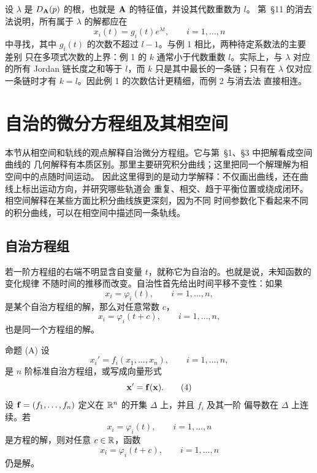 设 \(\lambda\) 是 \(D_{\mathbf{A}}(p)\) 的根，也就是 \(\mathbf{A}\) 的特征值，并设其代数重数为 \(l\)。
第~\S11 的消去法说明，所有属于 \(\lambda\) 的解都应在
\[
 x_i(t)=g_i(t)e^{\lambda t},\qquad i=1,\ldots,n
\]
中寻找，其中 \(g_i(t)\) 的次数不超过 \(l-1\)。与例 1 相比，两种待定系数法的主要差别
只在多项式次数的上界：例 1 的 \(k\) 通常小于代数重数 \(l\)。实际上，与 \(\lambda\)
对应的所有 Jordan 链长度之和等于 \(l\)，而 \(k\) 只是其中最长的一条链；只有在
\(\lambda\) 仅对应一条链时才有 \(k=l\)。因此例 1 的次数估计更精细，而例 2 与消去法
直接相连。

\section{自治的微分方程组及其相空间}

本节从相空间和轨线的观点解释自治微分方程组。它与第~\S1、\S3 中把解看成空间曲线的
几何解释有本质区别。那里主要研究积分曲线；这里把同一个解理解为相空间中的点随时间运动。
因此这里得到的是动力学解释：不仅画出曲线，还在曲线上标出运动方向，并研究哪些轨道会
重复、相交、趋于平衡位置或绕成闭环。相空间解释在某些方面比积分曲线族更深刻，因为不同
时间参数化下看起来不同的积分曲线，可以在相空间中描述同一条轨线。

\subsection*{自治方程组}

若一阶方程组的右端不明显含自变量 \(t\)，就称它为自治的。也就是说，未知函数的变化规律
不随时间的推移而改变。自治性首先给出时间平移不变性：如果
\begin{equation}
 x_i=\varphi_i(t),\qquad i=1,\ldots,n,
 \tag{1}
\end{equation}
是某个自治方程组的解，那么对任意常数 \(c\)，
\begin{equation}
 x_i=\varphi_i(t+c),\qquad i=1,\ldots,n,
 \tag{2}
\end{equation}
也是同一个方程组的解。

\begin{sourceitem}{命题 (A)}
设
\begin{equation}
 x_i'=f_i(x_1,\ldots,x_n),\qquad i=1,\ldots,n,
 \tag{3}
\end{equation}
是 \(n\) 阶标准自治方程组，或写成向量形式
\begin{equation}
 \vect{x}'=\vect{f}(\vect{x}).
 \tag{4}
\end{equation}
设 \(\vect{f}=(f_1,\ldots,f_n)\) 定义在 \(\mathbb R^n\) 的开集 \(\Delta\) 上，并且 \(f_i\) 及其一阶
偏导数在 \(\Delta\) 上连续。若
\begin{equation}
 x_i=\varphi_i(t),\qquad i=1,\ldots,n
 \tag{5}
\end{equation}
是方程的解，则对任意 \(c\in\mathbb R\)，函数
\begin{equation}
 x_i=\varphi_i(t+c),\qquad i=1,\ldots,n
 \tag{6}
\end{equation}
仍是解。
\end{sourceitem}

